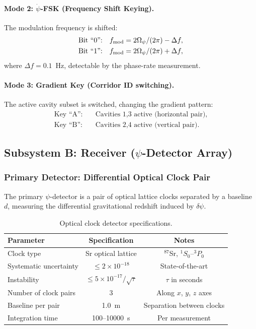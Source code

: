 \documentclass[11pt,onecolumn]{article}
\begin{document}
\paragraph{Mode 2: $\dot\psi$-FSK (Frequency Shift Keying).}
The modulation frequency is shifted:
\begin{align}
\text{Bit ``0'':} &\quad f_{\rm mod} = 2\Omega_\psi/(2\pi) - \Delta f, \\
\text{Bit ``1'':} &\quad f_{\rm mod} = 2\Omega_\psi/(2\pi) + \Delta f,
\end{align}
where $\Delta f = 0.1$~Hz, detectable by the phase-rate measurement.

\paragraph{Mode 3: Gradient Key (Corridor ID switching).}
The active cavity subset is switched, changing the gradient pattern:
\begin{align}
\text{Key ``A'':} &\quad \text{Cavities 1,3 active (horizontal pair)}, \\
\text{Key ``B'':} &\quad \text{Cavities 2,4 active (vertical pair)}.
\end{align}

\subsection{Subsystem B: Receiver ($\psi$-Detector Array)}

\subsubsection{Primary Detector: Differential Optical Clock Pair}

The primary $\psi$-detector is a pair of optical lattice clocks
separated by a baseline $d$, measuring the differential gravitational
redshift induced by $\delta\psi$.

\begin{table}[H]
\centering
\caption{Optical clock detector specifications.}
\label{tab:clock-specs}
\begin{tabular}{lcc}
\toprule
Parameter & Specification & Notes \\
\midrule
Clock type & Sr optical lattice & $^{87}$Sr, $^1S_0$--$^3P_0$ \\
Systematic uncertainty & $\leq 2 \times 10^{-18}$ & State-of-the-art \\
Instability & $\leq 5 \times 10^{-17}/\sqrt{\tau}$ & $\tau$ in seconds \\
Number of clock pairs & 3 & Along $x$, $y$, $z$ axes \\
Baseline per pair & 1.0~m & Separation between clocks \\
Integration time & 100--10000~s & Per measurement \\
\bottomrule
\end{tabular}
\end{table}
\end{document}
